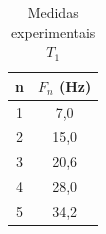 \begin{table}[H]
\centering
\caption{Medidas experimentais $T_1$ }
\begin{tabular}{cc}
\toprule
\textbf{n} & \textbf{$F_n$ (Hz)}\\
\midrule
        1   & 7,0        \\
        2   & 15,0       \\
        3   & 20,6       \\
        4   & 28,0       \\
        5   & 34,2       \\
\bottomrule
\end{tabular}
\label{tab:t1}
\end{table}